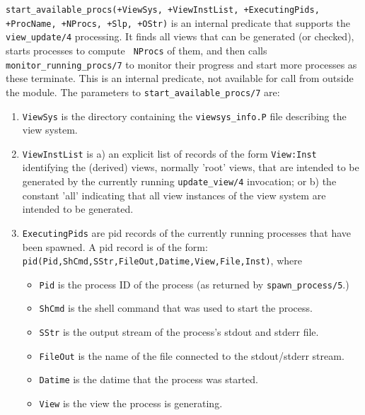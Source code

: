 \begin{description}
{\tt start\_available\_procs(+ViewSys, +ViewInstList, +ExecutingPids,
  +ProcName, +NProcs, +Slp, +OStr)} is an internal predicate that
supports the {\tt view\_update/4} processing.  It finds all views that
can be generated (or checked), starts processes to compute {\tt
  NProcs} of them, and then calls {\tt monitor\_running\_procs/7} to
monitor their progress and start more processes as these terminate.
This is an internal predicate, not available for call from outside the
module. The parameters to {\tt start\_available\_procs/7} are:

\begin{enumerate}

\item {\tt ViewSys} is the directory containing the
{\tt viewsys\_info.P} file describing the view system.

\item {\tt ViewInstList} is a) an explicit list of records of the form
{\tt View:Inst} identifying the (derived) views, normally 'root'
views, that are intended to be generated by the currently running
{\tt update\_view/4} invocation; or b) the constant 'all' indicating
that all view instances of the view system are intended to be
generated.

\item {\tt ExecutingPids} are pid records of the currently running
processes that have been spawned.  A pid record is of the form:
{\tt pid(Pid,ShCmd,SStr,FileOut,Datime,View,File,Inst)}, where

\begin{itemize}

\item {\tt Pid} is the process ID of the process (as returned by
{\tt spawn\_process/5}.)

\item {\tt ShCmd} is the shell command that was used to start the process.

\item {\tt SStr} is the output stream of the process's stdout and stderr file.

\item {\tt FileOut} is the name of the file connected to the stdout/stderr stream.

\item {\tt Datime} is the datime that the process was started.

\item {\tt View} is the view the process is generating.


\end{itemize}
\end{enumerate}
\end{description}
